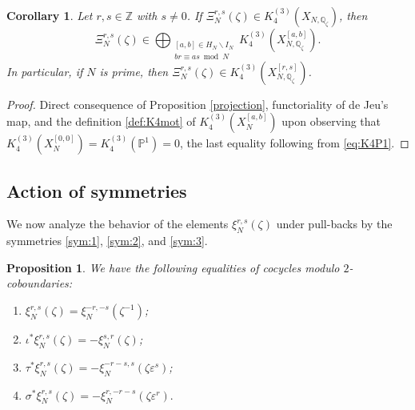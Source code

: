\documentclass[11pt,a4,leqno]{amsart}
\theoremstyle{my theoremstyle}
\newtheorem{prop}[thm]{Proposition}
\newtheorem{cor}[thm]{Corollary}
\theoremstyle{dfn}
\theoremstyle{remark}
\renewcommand{\1}{\mathbbm{1}}
\newcommand{\Z}{\mathbb{Z}}
\newcommand{\Q}{\mathbb{Q}}
\newcommand{\e}{\varepsilon}
\newcommand{\z}{\zeta}
\numberwithin{equation}{section}
\begin{document}
\begin{cor}\label{cor:pNrs}
    Let $r,s \in \Z$ with $s\neq 0$. If $\Xi^{r,s}_N(\zeta)\in K_4^{(3)}(X_{N,\Q_{\zeta}})$, then
    \[
    \Xi^{r,s}_N(\zeta)\in  \bigoplus_{\substack{[a,b] \in H_N\backslash I_N \\ br \equiv as \bmod{N}}} K_4^{(3)}(X_{N,\Q_{\zeta}}^{[a,b]}).
    \]
    In particular, if $N$ is prime, then $\Xi^{r,s}_N(\zeta)\in K_4^{(3)}(X_{N,\Q_{\zeta}}^{[r,s]})$.
\end{cor}

\begin{proof}
    Direct consequence of Proposition \ref{projection}, functoriality of de Jeu's map, and the definition \eqref{def:K4mot} of $K_4^{(3)}(X_N^{[a,b]})$ upon observing that $K_4^{(3)}(X_N^{[0,0]})=K_4^{(3)}(\mathbb{P}^1)=0$, the last equality following from \eqref{eq:K4P1}. 
\end{proof}

\subsection{Action of symmetries}

We now analyze the behavior of the elements $\xi^{r, s}_N(\zeta)$ under pull-backs by the symmetries \eqref{sym:1}, \eqref{sym:2}, and \eqref{sym:3}.

\begin{prop} \label{iota}
We have the following equalities of cocycles modulo $2$-coboundaries: 
\begin{enumerate}
\item  $\xi^{r, s}_N(\zeta)=\xi^{-r, -s}_N(\z^{-1})$;
\item $\iota^* \xi^{r, s}_N(\zeta)=-  \xi^{s, r}_N(\zeta)$;
\item $\tau^* \xi^{r, s}_N(\zeta)=-\xi^{-r-s, s}_N(\z \e^s)$;
\item $\sigma^* \xi^{r, s}_N(\zeta) =-\xi^{r, -r-s}_N(\z \e^r).$
\end{enumerate}
\end{prop}
\end{document}
